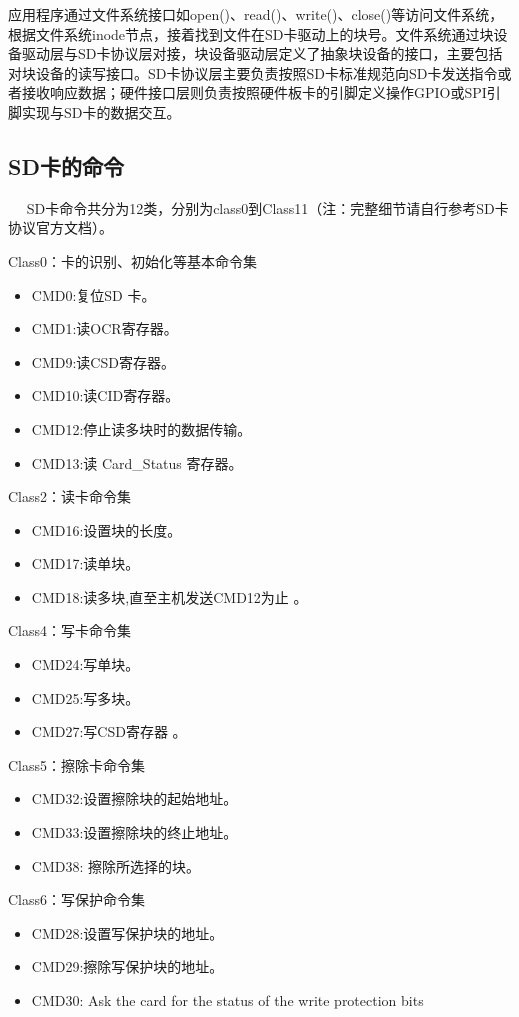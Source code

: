应用程序通过文件系统接口如open()、read()、write()、close()等访问文件系统，根据文件系统inode节点，接着找到文件在SD卡驱动上的块号。文件系统通过块设备驱动层与SD卡协议层对接，块设备驱动层定义了抽象块设备的接口，主要包括对块设备的读写接口。SD卡协议层主要负责按照SD卡标准规范向SD卡发送指令或者接收响应数据；硬件接口层则负责按照硬件板卡的引脚定义操作GPIO或SPI引脚实现与SD卡的数据交互。

\subsection{SD卡的命令}
　
SD卡命令共分为12类，分别为class0到Class11（注：完整细节请自行参考SD卡协议官方文档）。


Class0：卡的识别、初始化等基本命令集
\begin{itemize}
	\item CMD0:复位SD 卡。
	\item CMD1:读OCR寄存器。
	\item CMD9:读CSD寄存器。
	\item CMD10:读CID寄存器。
	\item CMD12:停止读多块时的数据传输。
	\item CMD13:读 Card\_Status 寄存器。
\end{itemize}

Class2：读卡命令集
\begin{itemize}
	\item CMD16:设置块的长度。
	\item CMD17:读单块。
	\item CMD18:读多块,直至主机发送CMD12为止 。
\end{itemize}

Class4：写卡命令集
\begin{itemize}
	\item CMD24:写单块。
	\item CMD25:写多块。
	\item CMD27:写CSD寄存器 。
\end{itemize}

Class5：擦除卡命令集
\begin{itemize}
	\item CMD32:设置擦除块的起始地址。
	\item CMD33:设置擦除块的终止地址。
	\item CMD38: 擦除所选择的块。
\end{itemize}

Class6：写保护命令集
\begin{itemize}
	\item CMD28:设置写保护块的地址。
	\item CMD29:擦除写保护块的地址。
	\item CMD30: Ask the card for the status of the write protection bits
\end{itemize}

